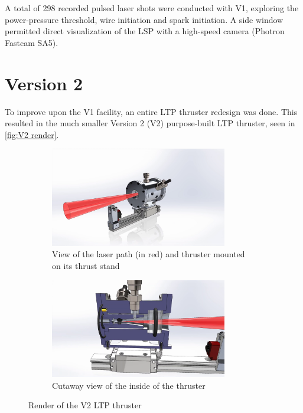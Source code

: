         A total of 298 recorded pulsed laser shots were conducted with V1, exploring the power-pressure threshold, wire initiation and spark initiation. A side window permitted direct visualization of the LSP with a high-speed camera (Photron Fastcam SA5).

    \section{Version 2} \label{sec:design_v2}

        To improve upon the V1 facility, an entire LTP thruster redesign was done. This resulted in the much smaller Version 2 (V2) purpose-built LTP thruster, seen in \autoref{fig:V2 render}.

        \begin{figure}[!ht]
            \centering
            \begin{subfigure}[t]{\textwidth}
                \centering
                \includegraphics[width=0.85\textwidth]{assets/3 design/V2 render 45 view.png}
                \caption{View of the laser path (in red) and thruster mounted on its thrust stand}
            \end{subfigure}
            \hfill
            \begin{subfigure}[t]{\textwidth}
                \centering
                \includegraphics[width=0.85\textwidth]{assets/3 design/V2 render cutout.png}
                \caption{Cutaway view of the inside of the thruster}
            \end{subfigure}
            \caption{Render of the V2 LTP thruster}
            \label{fig:V2 render}
        \end{figure}

